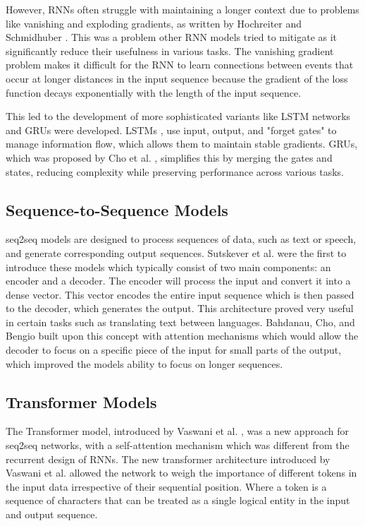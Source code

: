 However, \gls{RNN}s often struggle with maintaining a longer context due to problems like vanishing and exploding gradients, as written by Hochreiter and Schmidhuber \cite{hochreiter_long_1997}. This was a problem other \gls{RNN} models tried to mitigate as it significantly reduce their usefulness in various tasks. The vanishing gradient problem makes it difficult for the \gls{RNN} to learn connections between events that occur at longer distances in the input sequence because the gradient of the loss function decays exponentially with the length of the input sequence.


This led to the development of more sophisticated variants like \gls{LSTM} networks and \gls{GRU}s were developed. \gls{LSTM}s \cite{hochreiter_long_1997}, use input, output, and "forget gates" to manage information flow, which allows them to maintain stable gradients. \gls{GRU}s, which was proposed by Cho et al. \cite{cho_learning_2014}, simplifies this by merging the gates and states, reducing complexity while preserving performance across various tasks.


\subsection{Sequence-to-Sequence Models}


\gls{seq2seq} models are designed to process sequences of data, such as text or speech, and generate corresponding output sequences. Sutskever et al. \cite{sutskever_sequence_2014-1} were the first to introduce these models which typically consist of two main components: an encoder and a decoder. The encoder will process the input and convert it into a dense vector. This vector encodes the entire input sequence which is then passed to the decoder, which generates the output. This architecture proved very useful in certain tasks such as translating text between languages. Bahdanau, Cho, and Bengio built upon this concept with attention mechanisms \cite{bahdanau_neural_2014} which would allow the decoder to focus on a specific piece of the input for small parts of the output, which improved the models ability to focus on longer sequences.


\subsection{Transformer Models}


The Transformer model, introduced by Vaswani et al. \cite{vaswani_attention_2017}, was a new approach for \gls{seq2seq} networks, with a self-attention mechanism which was different from the recurrent design of \gls{RNN}s. The new transformer architecture introduced by Vaswani et al. allowed the network to weigh the importance of different tokens in the input data irrespective of their sequential position. Where a token is a sequence of characters that can be treated as a single logical entity in the input and output sequence.


